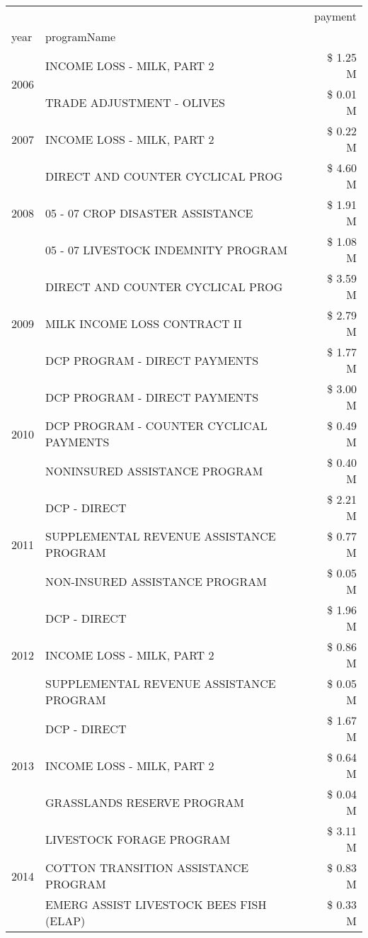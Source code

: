 \begin{tabular}{llr}
\toprule
 &  & payment \\
year & programName &  \\
\midrule
\multirow[t]{2}{*}{2006} & INCOME LOSS - MILK, PART 2 & \$ 1.25 M \\
 & TRADE ADJUSTMENT - OLIVES & \$ 0.01 M \\
\cline{1-3}
2007 & INCOME LOSS - MILK, PART 2 & \$ 0.22 M \\
\cline{1-3}
\multirow[t]{3}{*}{2008} & DIRECT AND COUNTER CYCLICAL PROG & \$ 4.60 M \\
 & 05 - 07 CROP DISASTER ASSISTANCE & \$ 1.91 M \\
 & 05 - 07 LIVESTOCK INDEMNITY PROGRAM & \$ 1.08 M \\
\cline{1-3}
\multirow[t]{3}{*}{2009} & DIRECT AND COUNTER CYCLICAL PROG & \$ 3.59 M \\
 & MILK INCOME LOSS CONTRACT II & \$ 2.79 M \\
 & DCP PROGRAM - DIRECT PAYMENTS & \$ 1.77 M \\
\cline{1-3}
\multirow[t]{3}{*}{2010} & DCP PROGRAM - DIRECT PAYMENTS & \$ 3.00 M \\
 & DCP PROGRAM - COUNTER CYCLICAL PAYMENTS & \$ 0.49 M \\
 & NONINSURED ASSISTANCE PROGRAM & \$ 0.40 M \\
\cline{1-3}
\multirow[t]{3}{*}{2011} & DCP - DIRECT & \$ 2.21 M \\
 & SUPPLEMENTAL REVENUE ASSISTANCE PROGRAM & \$ 0.77 M \\
 & NON-INSURED ASSISTANCE PROGRAM & \$ 0.05 M \\
\cline{1-3}
\multirow[t]{3}{*}{2012} & DCP - DIRECT & \$ 1.96 M \\
 & INCOME LOSS - MILK, PART 2 & \$ 0.86 M \\
 & SUPPLEMENTAL REVENUE ASSISTANCE PROGRAM & \$ 0.05 M \\
\cline{1-3}
\multirow[t]{3}{*}{2013} & DCP - DIRECT & \$ 1.67 M \\
 & INCOME LOSS - MILK, PART 2 & \$ 0.64 M \\
 & GRASSLANDS RESERVE PROGRAM & \$ 0.04 M \\
\cline{1-3}
\multirow[t]{3}{*}{2014} & LIVESTOCK FORAGE PROGRAM & \$ 3.11 M \\
 & COTTON TRANSITION ASSISTANCE PROGRAM & \$ 0.83 M \\
 & EMERG ASSIST LIVESTOCK BEES FISH (ELAP) & \$ 0.33 M \\
\cline{1-3}

\end{tabular}
